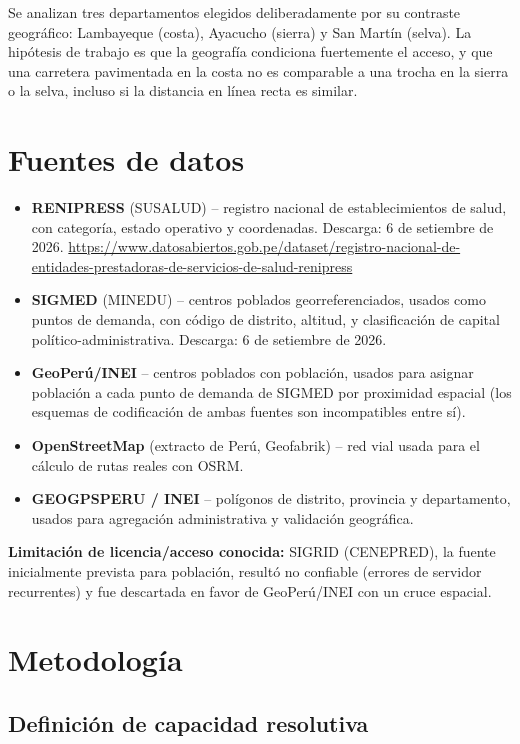 \documentclass[11pt,a4paper]{article}
\begin{document}
Se analizan tres departamentos elegidos deliberadamente por su contraste
geográfico: Lambayeque (costa), Ayacucho (sierra) y San Martín (selva). La
hipótesis de trabajo es que la geografía condiciona fuertemente el acceso, y que
una carretera pavimentada en la costa no es comparable a una trocha en la
sierra o la selva, incluso si la distancia en línea recta es similar.

\section{Fuentes de datos}

\begin{itemize}
  \item \textbf{RENIPRESS} (SUSALUD) -- registro nacional de establecimientos de
  salud, con categoría, estado operativo y coordenadas. Descarga: 6 de setiembre
  de 2026. \url{https://www.datosabiertos.gob.pe/dataset/registro-nacional-de-entidades-prestadoras-de-servicios-de-salud-renipress}
  \item \textbf{SIGMED} (MINEDU) -- centros poblados georreferenciados, usados
  como puntos de demanda, con código de distrito, altitud, y clasificación de
  capital político-administrativa. Descarga: 6 de setiembre de 2026.
  \item \textbf{GeoPerú/INEI} -- centros poblados con población, usados para
  asignar población a cada punto de demanda de SIGMED por proximidad espacial
  (los esquemas de codificación de ambas fuentes son incompatibles entre sí).
  \item \textbf{OpenStreetMap} (extracto de Perú, Geofabrik) -- red vial usada
  para el cálculo de rutas reales con OSRM.
  \item \textbf{GEOGPSPERU / INEI} -- polígonos de distrito, provincia y
  departamento, usados para agregación administrativa y validación geográfica.
\end{itemize}

\textbf{Limitación de licencia/acceso conocida:} SIGRID (CENEPRED), la fuente
inicialmente prevista para población, resultó no confiable (errores de servidor
recurrentes) y fue descartada en favor de GeoPerú/INEI con un cruce espacial.

\section{Metodología}

\subsection{Definición de capacidad resolutiva}
\end{document}

